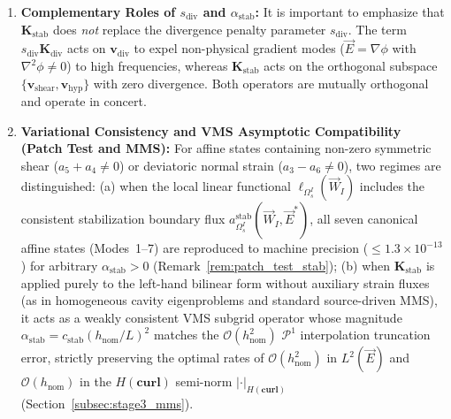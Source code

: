 \documentclass[preprint,12pt]{elsarticle}
\begin{document}
\begin{enumerate}
          \begin{equation}
              \begin{aligned}
                  (\mathbf{v}_{\mathrm{shear}}^I \cdot \mathbf{u}_I)^2 + (\mathbf{v}_{\mathrm{hyp}}^I \cdot \mathbf{u}_I)^2 & = (\partial_x E_y^h + \partial_y E_x^h)^2 + (\partial_x E_x^h - \partial_y E_y^h)^2 \\
                                                                                                                            & = 2 \, \|\operatorname{dev}\boldsymbol{\varepsilon}(\vec{E}^h)\|_F^2,
              \end{aligned}
          \end{equation}
          where $\operatorname{dev}\boldsymbol{\varepsilon}(\vec{E}^h) = \boldsymbol{\varepsilon}(\vec{E}^h) - \frac{1}{2}(\nabla \cdot \vec{E}^h)\mathbf{I}_2$ is the symmetric traceless (deviatoric) gradient tensor and $\|\cdot\|_F$ is the Frobenius norm. Consequently, $\mathbf{K}_{I, \mathrm{stab}}^{\mathrm{local}}$ is strictly isotropic and objective with respect to arbitrary rotations of the global coordinate system.
    \item \textbf{Complementary Roles of $s_{\mathrm{div}}$ and $\alpha_{\mathrm{stab}}$:} It is important to emphasize that $\mathbf{K}_{\mathrm{stab}}$ does \emph{not} replace the divergence penalty parameter $s_{\mathrm{div}}$. The term $s_{\mathrm{div}} \mathbf{K}_{\mathrm{div}}$ acts on $\mathbf{v}_{\mathrm{div}}$ to expel non-physical gradient modes ($\vec{E} = \nabla\phi$ with $\nabla^2\phi \ne 0$) to high frequencies, whereas $\mathbf{K}_{\mathrm{stab}}$ acts on the orthogonal subspace $\{\mathbf{v}_{\mathrm{shear}}, \mathbf{v}_{\mathrm{hyp}}\}$ with zero divergence. Both operators are mutually orthogonal and operate in concert.
    \item \textbf{Variational Consistency and VMS Asymptotic Compatibility (Patch Test and MMS):} For affine states containing non-zero symmetric shear ($a_5 + a_4 \ne 0$) or deviatoric normal strain ($a_3 - a_6 \ne 0$), two regimes are distinguished: (a) when the local linear functional $\ell_{\Omega_s^I}(\vec{W}_I)$ includes the consistent stabilization boundary flux $a_{\Omega_s^I}^{\mathrm{stab}}(\vec{W}_I, \vec{E}^*)$, all seven canonical affine states (Modes~1--7) are reproduced to machine precision ($\le 1.3 \times 10^{-13}$) for arbitrary $\alpha_{\mathrm{stab}} > 0$ (Remark~\ref{rem:patch_test_stab}); (b) when $\mathbf{K}_{\mathrm{stab}}$ is applied purely to the left-hand bilinear form without auxiliary strain fluxes (as in homogeneous cavity eigenproblems and standard source-driven MMS), it acts as a weakly consistent VMS subgrid operator whose magnitude $\alpha_{\mathrm{stab}} = c_{\mathrm{stab}} (h_{\mathrm{nom}}/L)^2$ matches the $\mathcal{O}(h_{\mathrm{nom}}^2)$ $\mathcal{P}^1$ interpolation truncation error, strictly preserving the optimal rates of $\mathcal{O}(h_{\mathrm{nom}}^2)$ in $L^2(\vec{E})$ and $\mathcal{O}(h_{\mathrm{nom}})$ in the $H(\mathbf{curl})$ semi-norm $|\cdot|_{H(\mathbf{curl})}$ (Section~\ref{subsec:stage3_mms}).

\end{enumerate}
\end{document}
